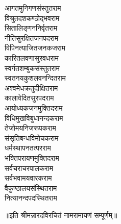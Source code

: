 \begin{large}
\begin{multicols}{2}
आगतमुनिगणसंस्तुत\hfill राम\\
विश्रुतदशकण्ठोद्भव\hfill राम\\
सितालिङ्गननिर्वृत\hfill राम\\
नीतिसुरक्षितजनपद\hfill राम\\
विपिनत्याजितजनकज\hfill राम\\
कारितलवणासुरवध\hfill राम\\
स्वर्गतशम्बुकसंस्तुत\hfill राम\\
स्वतनयकुशलवनन्दित\hfill राम\\
अश्वमेधक्रतुदीक्षित\hfill राम\\
कालावेदितसुरपद\hfill राम\\
आयोध्यकजनमुक्तिद\hfill राम\\
विधिमुखविबुधानन्दक\hfill राम\\
तेजोमयनिजरूपक\hfill राम\\
संसृतिबन्धविमोचक\hfill राम\\
धर्मस्थापनतत्पर\hfill राम\\
भक्तिपरायणमुक्तिद\hfill राम\\
सर्वचराचरपालक\hfill राम\\
सर्वभवामयवारक\hfill राम\\
वैकुण्ठालयसंस्थित\hfill राम\\
नित्यानन्दपदस्थित\hfill राम\\
\jaya
\end{multicols}
\vspace{-0.5cm}
॥इति श्रीमन्नारदविरचितं नामरामायणं सम्पूर्णम्॥
\end{large}

\closesection